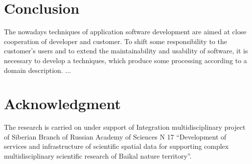 \documentclass[conference]{IEEEtran}
\begin{document}
\section{Conclusion}

The nowadays techniques of application software development are aimed at close cooperation of developer and customer.  To shift some responsibility to the customer's users and to extend the maintainability and usability of software, it is necessary to develop a techniques, which produce some processing according to a domain description.  ...



\section*{Acknowledgment}
The research is carried on under support of Integration multidisciplinary project of Siberian Branch of Russian Academy of Sciences N 17 “Development of services and infrastructure of scientific spatial data for supporting complex multidisciplinary scientific research of Baikal nature territory”.



\end{document}
